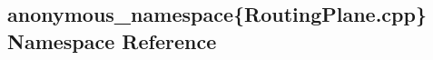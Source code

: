 \hypertarget{namespaceanonymous__namespace_02RoutingPlane_8cpp_03}{}\subsection{anonymous\+\_\+namespace\{Routing\+Plane.\+cpp\} Namespace Reference}
\label{namespaceanonymous__namespace_02RoutingPlane_8cpp_03}
